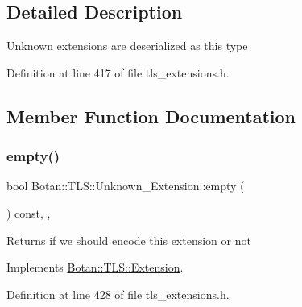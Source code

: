 \subsection{Detailed Description}
Unknown extensions are deserialized as this type 

Definition at line 417 of file tls\+\_\+extensions.\+h.



\subsection{Member Function Documentation}
\mbox{\label{class_botan_1_1_t_l_s_1_1_unknown___extension_a0b2f674ad0a239c57c20eda9caf60783}} 
\subsubsection{\texorpdfstring{empty()}{empty()}}
{\footnotesize\ttfamily bool Botan\+::\+T\+L\+S\+::\+Unknown\+\_\+\+Extension\+::empty (\begin{DoxyParamCaption}{ }\end{DoxyParamCaption}) const\hspace{0.3cm}{\ttfamily [inline]}, {\ttfamily [override]}, {\ttfamily [virtual]}}

\begin{DoxyReturn}{Returns}
if we should encode this extension or not 
\end{DoxyReturn}


Implements \mbox{\hyperlink{class_botan_1_1_t_l_s_1_1_extension_aa850b9be2322f94e7c65e583cd51acc5}{Botan\+::\+T\+L\+S\+::\+Extension}}.



Definition at line 428 of file tls\+\_\+extensions.\+h.

\mbox{\label{class_botan_1_1_t_l_s_1_1_unknown___extension_aa0edf5df42996a8634ac7a0d35114e2f}} 
